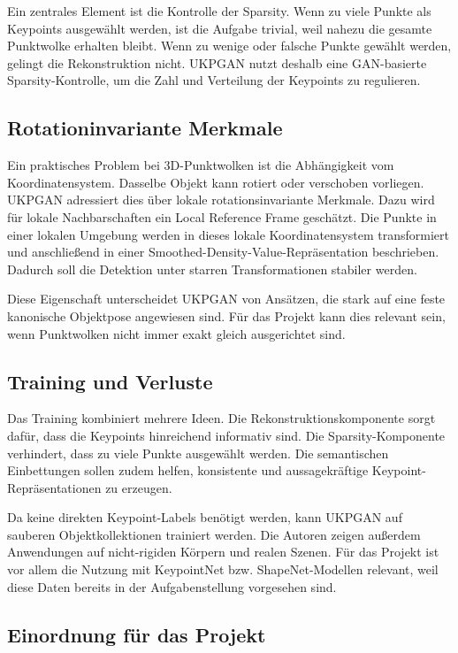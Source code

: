 \documentclass[11pt,a4paper]{article}
\begin{document}
Ein zentrales Element ist die Kontrolle der Sparsity. Wenn zu viele Punkte als Keypoints ausgewählt werden, ist die Aufgabe trivial, weil nahezu die gesamte Punktwolke erhalten bleibt. Wenn zu wenige oder falsche Punkte gewählt werden, gelingt die Rekonstruktion nicht. UKPGAN nutzt deshalb eine GAN-basierte Sparsity-Kontrolle, um die Zahl und Verteilung der Keypoints zu regulieren.

\subsection{Rotationinvariante Merkmale}

Ein praktisches Problem bei 3D-Punktwolken ist die Abhängigkeit vom Koordinatensystem. Dasselbe Objekt kann rotiert oder verschoben vorliegen. UKPGAN adressiert dies über lokale rotationsinvariante Merkmale. Dazu wird für lokale Nachbarschaften ein Local Reference Frame geschätzt. Die Punkte in einer lokalen Umgebung werden in dieses lokale Koordinatensystem transformiert und anschließend in einer Smoothed-Density-Value-Repräsentation beschrieben. Dadurch soll die Detektion unter starren Transformationen stabiler werden.

Diese Eigenschaft unterscheidet UKPGAN von Ansätzen, die stark auf eine feste kanonische Objektpose angewiesen sind. Für das Projekt kann dies relevant sein, wenn Punktwolken nicht immer exakt gleich ausgerichtet sind.

\subsection{Training und Verluste}

Das Training kombiniert mehrere Ideen. Die Rekonstruktionskomponente sorgt dafür, dass die Keypoints hinreichend informativ sind. Die Sparsity-Komponente verhindert, dass zu viele Punkte ausgewählt werden. Die semantischen Einbettungen sollen zudem helfen, konsistente und aussagekräftige Keypoint-Repräsentationen zu erzeugen.

Da keine direkten Keypoint-Labels benötigt werden, kann UKPGAN auf sauberen Objektkollektionen trainiert werden. Die Autoren zeigen außerdem Anwendungen auf nicht-rigiden Körpern und realen Szenen. Für das Projekt ist vor allem die Nutzung mit KeypointNet bzw. ShapeNet-Modellen relevant, weil diese Daten bereits in der Aufgabenstellung vorgesehen sind.

\subsection{Einordnung für das Projekt}
\end{document}
